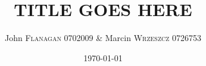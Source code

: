 \documentclass[pdftex,11pt,a4paper]{article}
\author{John \textsc{Flanagan} 0702009 \& Marcin \textsc{Wrzeszcz} 0726753 }
\title{TITLE GOES HERE}
\date{\today}
\begin{document}

\pagebreak





\tableofcontents
\pagebreak




\def\refname{}


\end{document}

